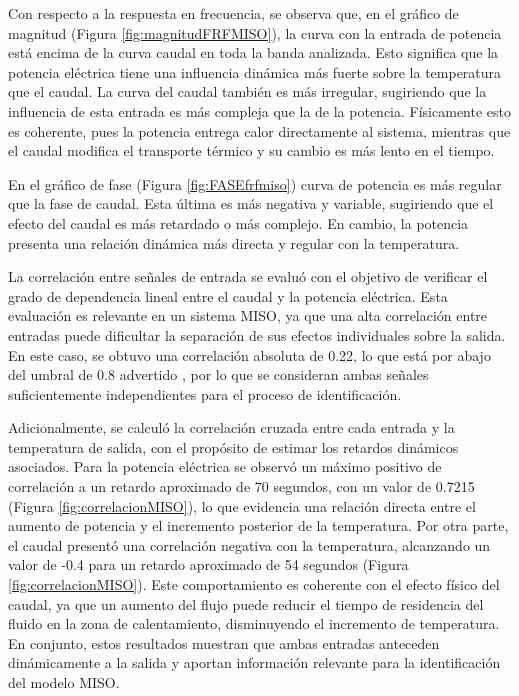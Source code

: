 \documentclass[11pt]{report}
\begin{document}
Con respecto a la respuesta en frecuencia, se observa que, en el gráfico de magnitud (Figura \ref{fig:magnitudFRFMISO}), la curva con la entrada de potencia está encima de la curva caudal en toda la banda analizada. Esto significa que la potencia eléctrica tiene una influencia dinámica más fuerte sobre la temperatura que el caudal. La curva del caudal también es más irregular, sugiriendo que la influencia de esta entrada es más compleja que la de la potencia. Físicamente esto es coherente, pues la potencia entrega calor directamente al sistema, mientras que el caudal modifica el transporte térmico y su cambio es más lento en el tiempo.

En el gráfico de fase (Figura \ref{fig:FASEfrfmiso}) curva de potencia es más regular que la fase de caudal. Esta última es más negativa y variable, sugiriendo que el efecto del caudal es más retardado o más complejo. En cambio, la potencia presenta una relación dinámica más directa y regular con la temperatura.



La correlación entre señales de entrada se evaluó con el objetivo de verificar el grado de dependencia lineal entre el caudal y la potencia eléctrica. Esta evaluación es relevante en un sistema MISO, ya que una alta correlación entre entradas puede dificultar la separación de sus efectos individuales sobre la salida. En este caso, se obtuvo una correlación absoluta de 0.22, lo que está por abajo del umbral de 0.8 advertido \cite{csurcsia2020user}, por lo que se consideran ambas señales suficientemente independientes para el proceso de identificación.

Adicionalmente, se calculó la correlación cruzada entre cada entrada y la temperatura de salida, con el propósito de estimar los retardos dinámicos asociados. Para la potencia eléctrica se observó un máximo positivo de correlación a un retardo aproximado de 70 segundos, con un valor de 0.7215 (Figura \ref{fig:correlacionMISO}), lo que evidencia una relación directa entre el aumento de potencia y el incremento posterior de la temperatura. Por otra parte, el caudal presentó una correlación negativa con la temperatura, alcanzando un valor de -0.4 para un retardo aproximado de 54 segundos (Figura \ref{fig:correlacionMISO}). Este comportamiento es coherente con el efecto físico del caudal, ya que un aumento del flujo puede reducir el tiempo de residencia del fluido en la zona de calentamiento, disminuyendo el incremento de temperatura. En conjunto, estos resultados muestran que ambas entradas anteceden dinámicamente a la salida y aportan información relevante para la identificación del modelo MISO.
\end{document}
